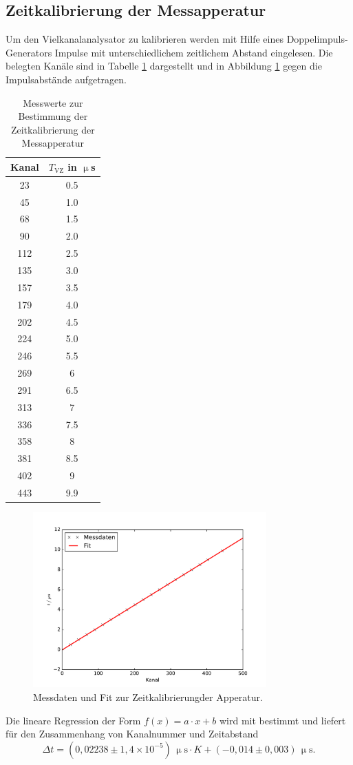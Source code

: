 \subsection{Zeitkalibrierung der Messapperatur}
Um den Vielkanalanalysator zu kalibrieren werden mit Hilfe eines Doppelimpuls-Generators Impulse mit unterschiedlichem
zeitlichem Abstand eingelesen. Die belegten Kanäle sind in Tabelle \ref{tab:Kalibrierung} dargestellt und in Abbildung \ref{fig:Kalibrierung}
gegen die Impulsabstände aufgetragen.
\begin{table}[H]
\centering
\caption{Messwerte zur Bestimmung der Zeitkalibrierung der Messapperatur}
\label{tab:Kalibrierung}
\begin{tabular}{c|c}
Kanal&$T_{\text{VZ}}$ in $\upmu$s\\
\hline
23&	0.5\\
45&	1.0\\
68&	1.5\\
90&	2.0\\
112&	2.5\\
135&	3.0\\
157&	3.5\\
179&	4.0\\
202&	4.5\\
224&	5.0\\
246&	5.5\\
269&	6\\
291&	6.5\\
313&	7\\
336&	7.5\\
358&	8\\
381&	8.5\\
402&	9\\
443&	9.9\\
\end{tabular}
\end{table}
\begin{figure}
  \centering
  \includegraphics[width=0.8\textwidth]{plots/plotKanal.pdf}
  \caption{Messdaten und Fit zur Zeitkalibrierungder Apperatur.}
  \label{fig:Kalibrierung}
\end{figure}
Die lineare Regression der Form $f(x)=a\cdot x+b$ wird mit \cite{scipy} bestimmt und liefert für den Zusammenhang von Kanalnummer und Zeitabstand
\begin{equation}
  \Delta t =\left(0,02238 \pm 1,4\times 10^{-5}\right)\,\upmu\text{s}\cdot K + \left(-0,014 ± 0,003\right)\,\upmu\text{s}.
  \label{eq:KanalZeit}
\end{equation}
